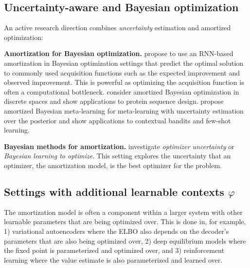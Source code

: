 \subsection{Uncertainty-aware and Bayesian optimization}
An active research direction combines \emph{uncertainty} estimation
and amortized optimization:

\textbf{Amortization for Bayesian optimization.}
\citet{chen2017learning} propose to use an RNN-based
  amortization in Bayesian optimization settings that
  predict the optimal solution to commonly used
  acquisition functions such as the expected improvement
  and observed improvement.
  This is powerful as optimizing the acquisition function
  is often a computational bottleneck.
\citet{swersky2020amortized} consider amortized
  Bayesian optimization in discrete spaces and show
  applications to protein sequence design.
\citet{ravi2018amortized} propose amortized
  Bayesian meta-learning for meta-learning with uncertainty
  estimation over the posterior and show applications to
  contextual bandits and few-shot learning.

\textbf{Bayesian methods for amortization.}
\citet{you2022bayesian} investigate \emph{optimizer uncertainty}
or \emph{Bayesian learning to optimize}.
This setting explores the uncertainty that an optimizer,
\eg the amortization model, is the best optimizer for
the problem.


\subsection{Settings with additional learnable contexts $\varphi$}
The amortization model is often a component within a larger system
with other learnable parameters that are being optimized over.
This is done in, for example, 1) variational autoencoders
where the ELBO also depends on the decoder's parameters
that are also being optimized over,
2) deep equilibrium models where the fixed point
is parameterized and optimized over, and
3) reinforcement learning where the value estimate is
also parameterized and learned over.

